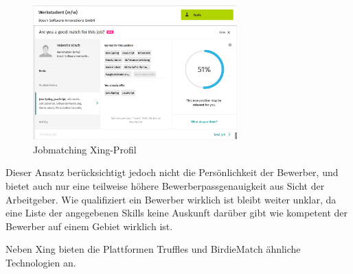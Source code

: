 \begin{figure}[htb]
 \centering
 \includegraphics[width=0.7\textwidth,angle=0]{abb/xing_jobmatching}
 \caption[Beschreibung]{Jobmatching Xing-Profil}
\label{fig:Beschreibung}
\end{figure}

Dieser Ansatz berücksichtigt jedoch nicht die Persönlichkeit der Bewerber, und bietet auch nur eine teilweise höhere Bewerberpassgenauigkeit aus Sicht der Arbeitgeber. Wie qualifiziert ein Bewerber wirklich ist bleibt weiter unklar, da eine Liste der angegebenen Skills keine Auskunft darüber gibt wie kompetent der Bewerber auf einem Gebiet wirklich ist. 

Neben Xing bieten die Plattformen Truffles und BirdieMatch ähnliche Technologien an.




